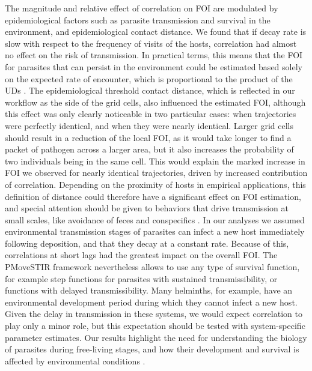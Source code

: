 \documentclass[letterpaper]{article}
\begin{document}
The magnitude and relative effect of correlation on FOI are modulated by epidemiological factors such as parasite transmission and survival in the environment, and epidemiological contact distance. We found that if decay rate is slow with respect to the frequency of visits of the hosts, correlation had almost no effect on the risk of transmission. In practical terms, this means that the FOI for parasites that can persist in the environment could be estimated based solely on the expected rate of encounter, which is proportional to the product of the UDs \citep{Noonan2021}. 
The epidemiological threshold contact distance, which is reflected in our workflow as the side of the grid cells, also influenced the estimated FOI, although this effect was only clearly noticeable in two particular cases: when trajectories were perfectly identical, and when they were nearly identical. Larger grid cells should result in a reduction of the local FOI, as it would take longer to find a packet of pathogen across a larger area, but it also increases the probability of two individuals being in the same cell. This would explain the marked increase in FOI we observed for nearly identical trajectories, driven by increased contribution of correlation. Depending on the proximity of hosts in empirical applications, this definition of distance could therefore have a significant effect on FOI estimation, and special attention should be given to behaviors that drive transmission at small scales, like avoidance of feces and conspecifics \citep{Weinstein2018,Fox2013}.
In our analyses we assumed environmental transmission stages of parasites can infect a new host immediately following deposition, and that they decay at a constant rate. Because of this, correlations at short lags had the greatest impact on the overall FOI. The PMoveSTIR framework nevertheless allows to use any type of survival function, for example step functions for parasites with sustained transmissibility, or functions with delayed transmissibility. Many helminths, for example, have an environmental development period during which they cannot infect a new host. Given the delay in transmission in these systems, we would expect correlation to play only a minor role, but this expectation should be tested with system-specific parameter estimates. Our results highlight the need for understanding the biology of parasites during free-living stages, and how their development and survival is affected by environmental conditions \citep{Thieltges2008}.   
\end{document}

